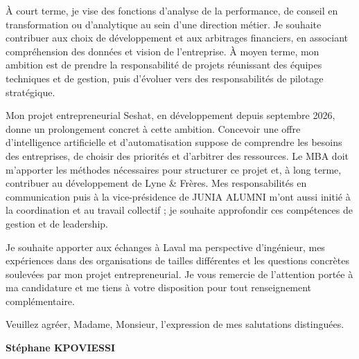 \documentclass[12pt,a4paper]{article}
\begin{document}
À court terme, je vise des fonctions d'analyse de la performance, de conseil en transformation ou d'analytique au sein d'une direction métier. Je souhaite contribuer aux choix de développement et aux arbitrages financiers, en associant compréhension des données et vision de l'entreprise. À moyen terme, mon ambition est de prendre la responsabilité de projets réunissant des équipes techniques et de gestion, puis d'évoluer vers des responsabilités de pilotage stratégique.

Mon projet entrepreneurial Seshat, en développement depuis septembre 2026, donne un prolongement concret à cette ambition. Concevoir une offre d'intelligence artificielle et d'automatisation suppose de comprendre les besoins des entreprises, de choisir des priorités et d'arbitrer des ressources. Le MBA doit m'apporter les méthodes nécessaires pour structurer ce projet et, à long terme, contribuer au développement de Lyne \& Frères. Mes responsabilités en communication puis à la vice-présidence de JUNIA ALUMNI m'ont aussi initié à la coordination et au travail collectif ; je souhaite approfondir ces compétences de gestion et de leadership.

Je souhaite apporter aux échanges à Laval ma perspective d'ingénieur, mes expériences dans des organisations de tailles différentes et les questions concrètes soulevées par mon projet entrepreneurial. Je vous remercie de l'attention portée à ma candidature et me tiens à votre disposition pour tout renseignement complémentaire.

Veuillez agréer, Madame, Monsieur, l'expression de mes salutations distinguées.

\vspace{0.5em}
\textbf{Stéphane KPOVIESSI}
\end{document}
